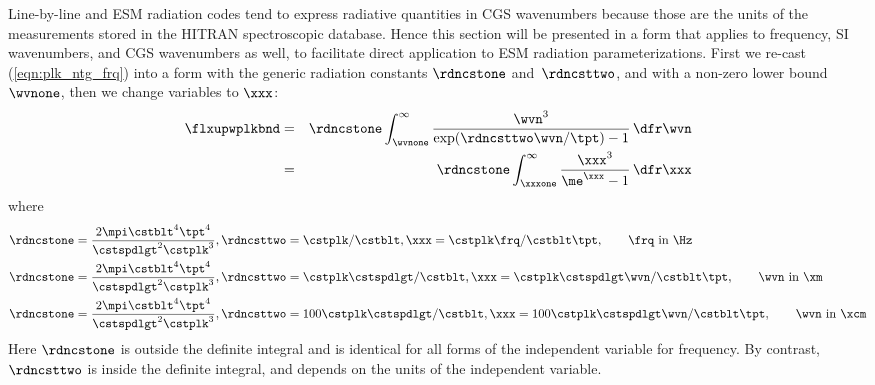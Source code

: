 \documentclass[12pt]{article}
\begin{document}
Line-by-line and ESM radiation codes tend to express radiative
quantities in CGS wavenumbers because those are the units of the
measurements stored in the HITRAN spectroscopic database. 
Hence this section will be presented in a form that applies to
frequency, SI wavenumbers, and CGS wavenumbers as well, to
facilitate direct application to ESM radiation parameterizations. 
First we re-cast (\ref{eqn:plk_ntg_frq}) into a form with the
generic radiation constants $\rdncstone$ and~$\rdncsttwo$, and
with a non-zero lower bound~$\wvnone$, then we change variables
to $\xxx$:
\begin{eqnarray}
\label{eqn:plk_ntg_wvn}
\flxupwplkbnd
& = & \rdncstone
\int_{\wvnone}^{\infty} 
\frac{\wvn^{3}}{\exp(\rdncsttwo\wvn/\tpt) - 1} \,\dfr\wvn \nonumber \\
\label{eqn:plk_ntg_xxx}
& = & \rdncstone
\int_{\xxxone}^{\infty} 
\frac{\xxx^{3}}{\me^{\xxx} - 1} \,\dfr\xxx
\end{eqnarray}
where
\begin{subequations}
\label{eqn:rdn_cst_dfn}
\begin{align}
\label{eqn:rdn_cst_one_frq_dfn}
\rdncstone & = \frac{2 \mpi \cstblt^{4} \tpt^{4} }{\cstspdlgt^{2} \cstplk^{3}},
\rdncsttwo = \cstplk / \cstblt,
      \xxx = \cstplk \frq / \cstblt \tpt,
               \qquad \mbox{\frq\ in \Hz} \\
\label{eqn:rdn_cst_one_wvn_dfn}
\rdncstone & = \frac{2 \mpi \cstblt^{4} \tpt^{4} }{\cstspdlgt^{2} \cstplk^{3}},
\rdncsttwo = \cstplk \cstspdlgt / \cstblt,
      \xxx = \cstplk \cstspdlgt \wvn / \cstblt \tpt,
               \qquad \mbox{\wvn\ in \xm} \\
\label{eqn:rdn_cst_one_wvn_cgs_dfn}
\rdncstone & = \frac{2 \mpi \cstblt^{4} \tpt^{4} }{\cstspdlgt^{2} \cstplk^{3}},
\rdncsttwo = 100 \cstplk \cstspdlgt / \cstblt,
      \xxx = 100 \cstplk \cstspdlgt \wvn / \cstblt \tpt,
               \qquad \mbox{\wvn\ in \xcm}
\end{align}
\end{subequations}
Here $\rdncstone$ is outside the definite integral and is identical for all
forms of the independent variable for frequency. 
By contrast, $\rdncsttwo$ is inside the definite integral, and depends on the units 
of the independent variable.
\end{document}
